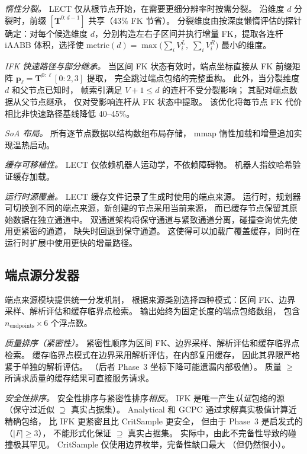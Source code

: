 \documentclass[journal]{IEEEtran}
\newcommand{\bT}{\mathbf{T}}
\begin{document}
\emph{惰性分裂。}
LECT 仅从根节点开始，在需要更细分辨率时按需分裂。
沿维度 $d$ 分裂时，前缀 $[\bT^{0:d-1}]$ 共享（43\% FK 节省）。
分裂维度由按深度懒惰评估的探针确定：对每个候选维度
$d$，分别构造左右子区间并执行增量 FK，提取各连杆 iAABB 体积，选择使
$\text{metric}(d) = \max\bigl(\sum_i V_i^L,\; \sum_i V_i^R\bigr)$ 最小的维度。

\emph{IFK 快速路径与部分继承。}
当区间 FK 状态有效时，端点坐标直接从 FK 前缀矩阵
$\bm{p}_\ell = \bT^{0:\ell}[0{:}2,3]$ 提取，
完全跳过端点包络的完整重构。
此外，当分裂维度 $d$ 和父节点已知时，
帧索引满足 $V+1 \leq d$ 的连杆不受分裂影响；
其配对端点数据从父节点继承，
仅对受影响连杆从 FK 状态中提取。
该优化将每节点 FK 代价相比非快速路径基线降低 40--45\%。

\emph{SoA 布局。}
所有逐节点数据以结构数组布局存储，
mmap 惰性加载和增量追加实现温热启动。

\emph{缓存可移植性。}
LECT 仅依赖机器人运动学，不依赖障碍物。
机器人指纹哈希验证缓存加载。

\emph{运行时源覆盖。}
LECT 缓存文件记录了生成时使用的端点来源。
运行时，规划器可切换到不同的端点来源，新创建的节点采用当前来源，
而已缓存节点保留其原始数据在独立通道中。
双通道架构将保守通道与紧致通道分离，碰撞查询优先使用更紧密的通道，
缺失时回退到保守通道。
这使得可以加载广覆盖缓存，同时在运行时扩展中使用更快的增量路径。

\subsection{端点源分发器}\label{sec:endpoint_dispatch}

端点来源模块提供统一分发机制，
根据来源类别选择四种模式：区间 FK、边界采样、解析评估和缓存临界点检索。
输出始终为固定长度的端点包络数组，
包含 $n_\text{endpoints} \times 6$ 个浮点数。

\emph{质量排序（紧密性）。}
紧密性顺序为区间 FK、边界采样、解析评估和缓存临界点检索。
缓存临界点模式在边界采用解析评估，在内部复用缓存，
因此其界限严格紧于单独的解析评估。
（后者 Phase~3 坐标下降可能遗漏内部极值）。
质量 $\geq$ 所请求质量的缓存结果可直接服务请求。

\emph{安全性排序。}
安全性排序与紧密性排序\emph{相反}。
IFK 是唯一产生\emph{认证}包络的源
（保守过近似 $\supseteq$ 真实占据集）。
Analytical 和 GCPC 通过求解真实极值计算近精确包络，
比 IFK 更紧密且比 CritSample 更安全，
但由于 Phase~3 是启发式的（$|F| \geq 3$），
不能形式化保证 $\supseteq$ 真实占据集。
实际中，由此不完备性导致的碰撞极其罕见。
CritSample 仅使用边界枚举，完备性缺口最大
（但仍然很小）。
\end{document}
